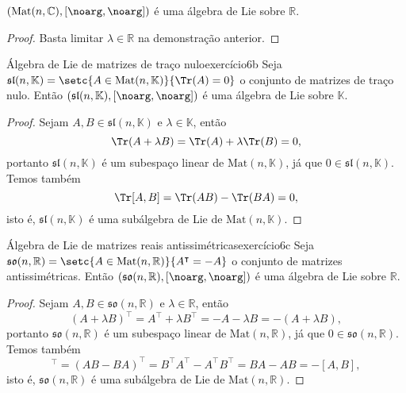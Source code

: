 \begin{corollary}
    \((\mathrm{Mat}(n, \mathbb{C}), [\noarg, \noarg])\) é uma álgebra de Lie sobre \(\mathbb{R}\).
\end{corollary}
\begin{proof}
    Basta limitar \(\lambda \in \mathbb{R}\) na demonstração anterior.
\end{proof}

\begin{proposition}{Álgebra de Lie de matrizes de traço nulo}{exercício6b}
    Seja \(\mathfrak{sl}(n, \mathbb{K}) = \setc{A \in \mathrm{Mat}(n, \mathbb{K})}{\Tr(A) = 0}\) o conjunto de matrizes de traço nulo. Então \((\mathfrak{sl}(n, \mathbb{K}), [\noarg, \noarg])\) é uma álgebra de Lie sobre \(\mathbb{K}\).
\end{proposition}
\begin{proof}
    Sejam \(A, B \in \mathfrak{sl}(n, \mathbb{K})\) e \(\lambda \in \mathbb{K}\), então
    \begin{equation*}
        \Tr(A + \lambda B) = \Tr(A) + \lambda \Tr(B) = 0,
    \end{equation*}
    portanto \(\mathfrak{sl}(n, \mathbb{K})\) é um subespaço linear de \(\mathrm{Mat}(n, \mathbb{K})\), já que \(0 \in \mathfrak{sl}(n, \mathbb{K})\). Temos também
    \begin{equation*}
        \Tr[A,B] = \Tr(AB) - \Tr(BA) = 0,
    \end{equation*}
    isto é, \(\mathfrak{sl}(n, \mathbb{K})\) é uma subálgebra de Lie de \(\mathrm{Mat}(n, \mathbb{K})\).
\end{proof}

\begin{proposition}{Álgebra de Lie de matrizes reais antissimétricas}{exercício6c}
    Seja \(\mathfrak{so}(n, \mathbb{R}) = \setc{A \in \mathrm{Mat}(n, \mathbb{R})}{A^\intercal = -A}\) o conjunto de matrizes antissimétricas. Então \((\mathfrak{so}(n, \mathbb{R}), [\noarg, \noarg])\) é uma álgebra de Lie sobre \(\mathbb{R}\).
\end{proposition}
\begin{proof}
    Sejam \(A, B \in \mathfrak{so}(n, \mathbb{R})\) e \(\lambda \in \mathbb{R}\), então
    \begin{equation*}
        (A + \lambda B)^\intercal = A^\intercal + \lambda B^\intercal = - A - \lambda B = - (A + \lambda B),
    \end{equation*}
    portanto \(\mathfrak{so}(n, \mathbb{R})\) é um subespaço linear de \(\mathrm{Mat}(n, \mathbb{R})\), já que \(0 \in \mathfrak{so}(n, \mathbb{R})\). Temos também
    \begin{equation*}
        [A,B]^\intercal = (AB - BA)^\intercal = B^\intercal A^\intercal - A^\intercal B^\intercal = BA - AB = -[A,B],
    \end{equation*}
    isto é, \(\mathfrak{so}(n, \mathbb{R})\) é uma subálgebra de Lie de \(\mathrm{Mat}(n, \mathbb{R})\).
\end{proof}

